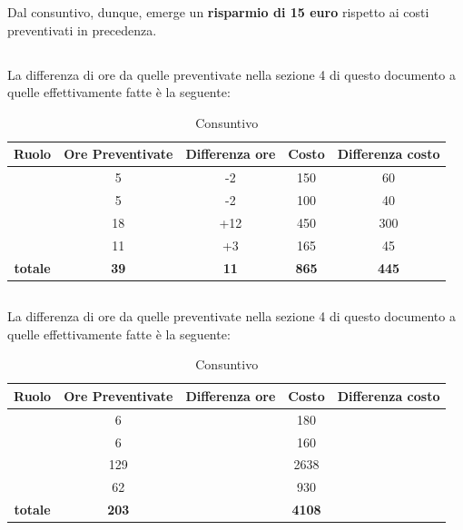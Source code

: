 Dal consuntivo, dunque, emerge un \textbf{risparmio di 15 euro} rispetto ai costi preventivati in precedenza.

\newpage

\subsection{\ARD}
La differenza di ore da quelle preventivate nella sezione 4 di questo documento a quelle effettivamente fatte è la seguente:

\begin{table}[h]
	\begin{center}
		\begin{tabular}{|c|c|c|c|c|}
			\hline
			\textbf{Ruolo}	& \textbf{Ore Preventivate} & \textbf{Differenza ore} & \textbf{Costo} & \textbf{Differenza costo}\\
			\hline
			\Pm &	5  & -2 & 150 & 60	\\
			\hline
			\Am	&	5 & -2 & 100 & 40\\
			\hline
			\An	&	18 & +12 & 450 & 300\\
			\hline
			\Ver &	11 & +3 & 165 & 45\\
			\hline
			\textbf{totale}	&	\textbf{39} & \textbf{11} & \textbf{865} & \textbf{445}\\
			\hline
		\end{tabular}
	\end{center}
	\caption{Consuntivo \ARD}
\end{table}

\newpage

\subsection{\PA}
La differenza di ore da quelle preventivate nella sezione 4 di questo documento a quelle effettivamente fatte è la seguente:

\begin{table}[h]
	\begin{center}
		\begin{tabular}{|c|c|c|c|c|}
			\hline
			\textbf{Ruolo}	& \textbf{Ore Preventivate} & \textbf{Differenza ore} & \textbf{Costo} & \textbf{Differenza costo}\\
			\hline
			\Pm &	6  & &	180 &	\\
			\hline
			\Am	&	6 &	& 160 & \\
			\hline
			\Prog	&	129 & & 2638 & \\
			\hline
			\Ver &	62 & & 930 & \\
			\hline
			\textbf{totale}	&	\textbf{203} & & \textbf{4108} & \\
			\hline
		\end{tabular}
	\end{center}
	\caption{Consuntivo \PA}
\end{table}

